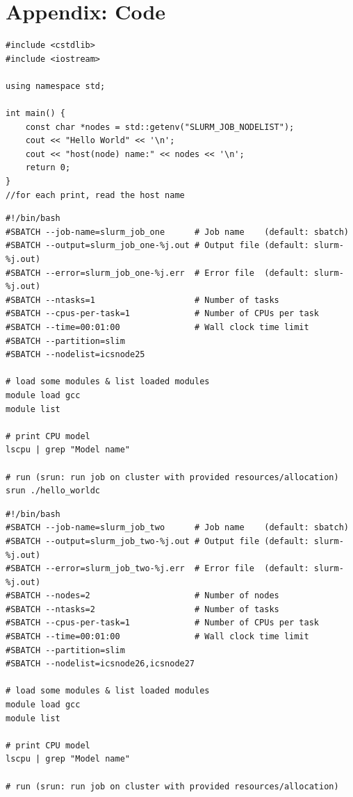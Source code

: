 \documentclass[unicode,11pt,a4paper,oneside,numbers=endperiod,openany]{scrartcl}
\begin{document}
\section{Appendix: Code}
\begin{lstlisting}[language=MyC++, style=mystyle, caption={Hello World Program}]
#include <cstdlib>
#include <iostream>
    
using namespace std;
    
int main() {
    const char *nodes = std::getenv("SLURM_JOB_NODELIST");
    cout << "Hello World" << '\n';
    cout << "host(node) name:" << nodes << '\n';
    return 0;
}
//for each print, read the host name
\end{lstlisting}

\begin{lstlisting}[language=MyBatch, style=mystyle, caption={Tmakefile of Compiler options}]
#!/bin/bash
#SBATCH --job-name=slurm_job_one      # Job name    (default: sbatch)
#SBATCH --output=slurm_job_one-%j.out # Output file (default: slurm-%j.out)
#SBATCH --error=slurm_job_one-%j.err  # Error file  (default: slurm-%j.out)
#SBATCH --ntasks=1                    # Number of tasks
#SBATCH --cpus-per-task=1             # Number of CPUs per task
#SBATCH --time=00:01:00               # Wall clock time limit
#SBATCH --partition=slim                 
#SBATCH --nodelist=icsnode25             

# load some modules & list loaded modules
module load gcc
module list

# print CPU model
lscpu | grep "Model name"

# run (srun: run job on cluster with provided resources/allocation)
srun ./hello_worldc

\end{lstlisting}

\begin{lstlisting}[language=MyBatch, style=mystyle, caption={The batch script of two node}]
#!/bin/bash
#SBATCH --job-name=slurm_job_two      # Job name    (default: sbatch)
#SBATCH --output=slurm_job_two-%j.out # Output file (default: slurm-%j.out)
#SBATCH --error=slurm_job_two-%j.err  # Error file  (default: slurm-%j.out)
#SBATCH --nodes=2                     # Number of nodes
#SBATCH --ntasks=2                    # Number of tasks
#SBATCH --cpus-per-task=1             # Number of CPUs per task
#SBATCH --time=00:01:00               # Wall clock time limit
#SBATCH --partition=slim 
#SBATCH --nodelist=icsnode26,icsnode27

# load some modules & list loaded modules
module load gcc
module list

# print CPU model
lscpu | grep "Model name"

# run (srun: run job on cluster with provided resources/allocation)

\end{lstlisting}
\end{document}
